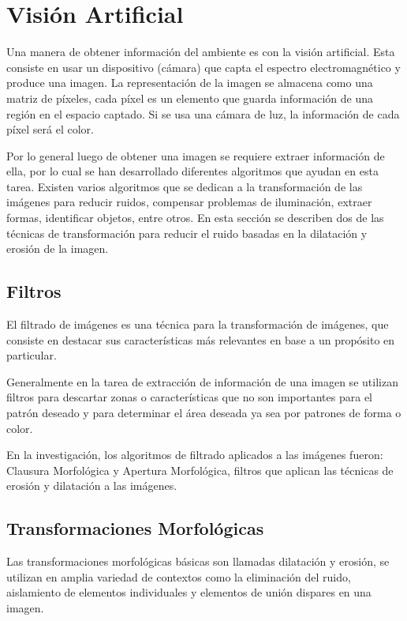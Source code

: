 \section{Visión Artificial} \label{sect:Vision_Artificial}

Una manera de obtener información del ambiente es con la visión artificial. Esta consiste en usar un dispositivo (cámara) que
capta el espectro electromagnético y produce una imagen. La representación de la imagen se almacena como una matriz de píxeles,
cada píxel es un elemento que guarda información de una región en el espacio captado. Si se usa una cámara de luz, la información
de cada píxel será el color. \cite{AiRobotics}  

Por lo general luego de obtener una imagen se requiere extraer información de ella, por lo cual se han desarrollado diferentes
algoritmos que ayudan en esta tarea. Existen varios algoritmos que se dedican a la transformación de las imágenes para reducir
ruidos, compensar problemas de iluminación, extraer formas, identificar objetos, entre otros. En esta sección se describen dos
de las técnicas de transformación para reducir el ruido basadas en la dilatación y erosión de la imagen. 

\subsection{Filtros }
El filtrado de imágenes es una técnica para la transformación de imágenes, que consiste en destacar  sus características más relevantes en base a un propósito en particular. 

Generalmente en la tarea de extracción de información de una imagen se utilizan filtros para descartar zonas o características que no son importantes para el patrón deseado y para determinar el área deseada ya sea por patrones de forma o color.

En la investigación, los algoritmos de filtrado aplicados a las imágenes fueron: Clausura Morfológica y Apertura Morfológica, filtros que aplican las técnicas de erosión y dilatación a las imágenes.

\subsection{Transformaciones Morfológicas}
Las transformaciones morfológicas básicas son llamadas dilatación y erosión, se utilizan en 
amplia variedad de contextos como la eliminación del ruido, aislamiento de elementos individuales y elementos de unión dispares
en una imagen.\cite{BookOpenCv}

